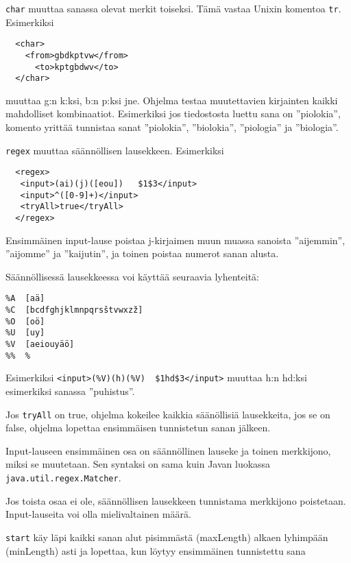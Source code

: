 \documentclass[12pt]{article}
\begin{document}


\bigskip
\verb|char| muuttaa sanassa olevat merkit toiseksi. Tämä vastaa Unixin
komentoa \verb|tr|. Esimerkiksi

\begin{verbatim}
  <char>
    <from>gbdkptvw</from>
      <to>kptgbdwv</to>
  </char>
\end{verbatim}

muuttaa g:n k:ksi, b:n p:ksi jne. Ohjelma testaa muutettavien
kirjainten kaikki mahdolliset kombinaatiot. Esimerkiksi jos
tiedostosta luettu sana on ''piolokia'', komento yrittää tunnistaa
sanat ''piolokia'', ''biolokia'', ''piologia'' ja ''biologia''.




\verb|regex| muuttaa säännöllisen lausekkeen. Esimerkiksi

\begin{verbatim}
  <regex>
   <input>(ai)(j)([eou])   $1$3</input>
   <input>^([0-9]+)</input>
   <tryAll>true</tryAll>
  </regex>
\end{verbatim}

Ensimmäinen input-lause poistaa j-kirjaimen muun muassa sanoista
''aijemmin'', ''aijomme'' ja ''kaijutin'', ja toinen poistaa numerot
sanan alusta.


Säännöllisessä lausekkeessa voi käyttää seuraavia lyhenteitä:

\begin{verbatim}
%A  [aä]
%C  [bcdfghjklmnpqrsštvwxzž]
%O  [oö]
%U  [uy]
%V  [aeiouyäö]
%%  %
\end{verbatim}

Esimerkiksi \verb=<input>(%V)(h)(%V)  $1hd$3</input>=
muuttaa h:n hd:ksi esimerkiksi sanassa ''puhistus''.


Jos \verb=tryAll= on true, ohjelma kokeilee kaikkia säänöllisiä
lausekkeita, jos se on false, ohjelma lopettaa ensimmäisen tunnistetun
sanan jälkeen.

Input-lauseen ensimmäinen osa on säännöllinen lauseke ja toinen
merkkijono, miksi se muutetaan. Sen syntaksi on sama kuin Javan
luokassa \verb=java.util.regex.Matcher=.

Jos toista osaa ei ole, säännöllisen lausekkeen tunnistama merkkijono
poistetaan. Input-lauseita voi olla mielivaltainen määrä.




\bigskip
\verb=start= käy läpi kaikki sanan alut pisimmästä (maxLength) alkaen
lyhimpään (minLength) asti ja lopettaa, kun löytyy ensimmäinen
tunnistettu sana
\end{document}
